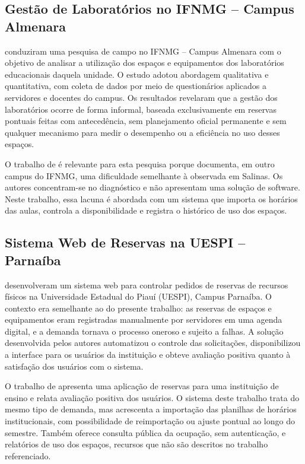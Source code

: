 \subsection{Gestão de Laboratórios no IFNMG -- Campus Almenara}
\label{sec:relcaio1}

 conduziram uma pesquisa de campo no IFNMG -- Campus Almenara com o objetivo de analisar a utilização dos espaços e equipamentos dos laboratórios educacionais daquela unidade. O estudo adotou abordagem qualitativa e quantitativa, com coleta de dados por meio de questionários aplicados a servidores e docentes do campus. Os resultados revelaram que a gestão dos laboratórios ocorre de forma informal, baseada exclusivamente em reservas pontuais feitas com antecedência, sem planejamento oficial permanente e sem qualquer mecanismo para medir o desempenho ou a eficiência no uso desses espaços.

O trabalho de  é relevante para esta pesquisa porque documenta, em outro campus do IFNMG, uma dificuldade semelhante à observada em Salinas. Os autores concentram-se no diagnóstico e não apresentam uma solução de software. Neste trabalho, essa lacuna é abordada com um sistema que importa os horários das aulas, controla a disponibilidade e registra o histórico de uso dos espaços.

\subsection{Sistema Web de Reservas na UESPI -- Parnaíba}
\label{sec:relcaio2}

 desenvolveram um sistema web para controlar pedidos de reservas de recursos físicos na Universidade Estadual do Piauí (UESPI), Campus Parnaíba. O contexto era semelhante ao do presente trabalho: as reservas de espaços e equipamentos eram registradas manualmente por servidores em uma agenda digital, e a demanda tornava o processo oneroso e sujeito a falhas. A solução desenvolvida pelos autores automatizou o controle das solicitações, disponibilizou a interface para os usuários da instituição e obteve avaliação positiva quanto à satisfação dos usuários com o sistema.

O trabalho de  apresenta uma aplicação de reservas para uma instituição de ensino e relata avaliação positiva dos usuários. O sistema deste trabalho trata do mesmo tipo de demanda, mas acrescenta a importação das planilhas de horários institucionais, com possibilidade de reimportação ou ajuste pontual ao longo do semestre. Também oferece consulta pública da ocupação, sem autenticação, e relatórios de uso dos espaços, recursos que não são descritos no trabalho referenciado.

